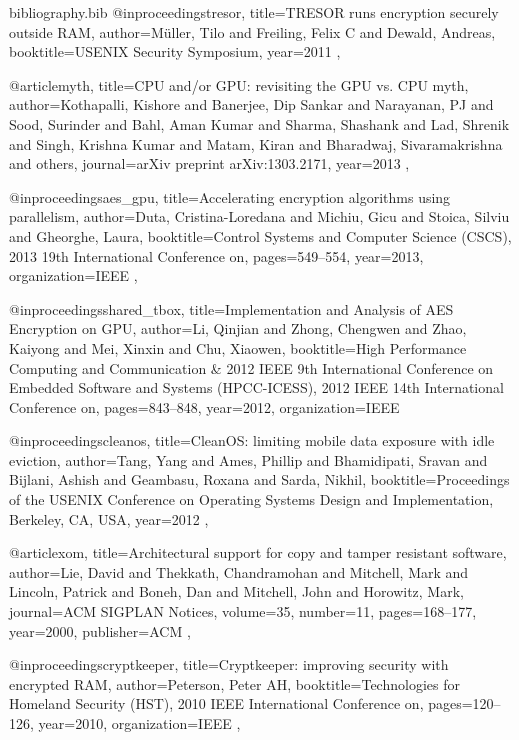 \documentclass[conference,10pt]{IEEEtran}
\begin{document}
\begin{filecontents*}{bibliography.bib}
    @inproceedings{tresor,
        title={{TRESOR runs encryption securely outside RAM}},
        author={M{\"u}ller, Tilo and Freiling, Felix C and Dewald, Andreas},
        booktitle={USENIX Security Symposium},
        year={2011}
    },

    @article{myth,
        title={{CPU and/or GPU: revisiting the GPU vs. CPU myth}},
        author={Kothapalli, Kishore and Banerjee, Dip Sankar and Narayanan, PJ and Sood, Surinder and Bahl, 
        Aman Kumar and Sharma, Shashank and Lad, Shrenik and Singh, Krishna Kumar and Matam, Kiran and 
    Bharadwaj, Sivaramakrishna and others},
        journal={arXiv preprint arXiv:1303.2171},
        year={2013}
    },

    @inproceedings{aes_gpu,
        title={Accelerating encryption algorithms using parallelism},
        author={Duta, Cristina-Loredana and Michiu, Gicu and Stoica, Silviu and Gheorghe, Laura},
        booktitle={Control Systems and Computer Science (CSCS), 2013 19th International Conference on},
        pages={549--554},
        year={2013},
        organization={IEEE}
    },

    @inproceedings{shared_tbox,
        title={Implementation and Analysis of AES Encryption on GPU},
        author={Li, Qinjian and Zhong, Chengwen and Zhao, Kaiyong and Mei, Xinxin and Chu, Xiaowen},
        booktitle={High Performance Computing and Communication \& 2012 IEEE 9th International Conference 
    on Embedded Software and Systems (HPCC-ICESS), 2012 IEEE 14th International Conference on},
        pages={843--848},
        year={2012},
        organization={IEEE}
    }

    @inproceedings{cleanos,
        title={{CleanOS: limiting mobile data exposure with idle eviction}},
        author={Tang, Yang and Ames, Phillip and Bhamidipati, Sravan and Bijlani, Ashish and Geambasu, 
        Roxana and Sarda, Nikhil},
        booktitle={Proceedings of the USENIX Conference on Operating Systems Design and Implementation, 
        Berkeley, CA, USA},
        year={2012}
    },

    @article{xom,
        title={Architectural support for copy and tamper resistant software},
        author={Lie, David and Thekkath, Chandramohan and Mitchell, Mark and Lincoln, Patrick and Boneh, 
        Dan and Mitchell, John and Horowitz, Mark},
        journal={ACM SIGPLAN Notices},
        volume={35},
        number={11},
        pages={168--177},
        year={2000},
        publisher={ACM}
    },

    @inproceedings{cryptkeeper,
        title={Cryptkeeper: improving security with encrypted RAM},
        author={Peterson, Peter AH},
        booktitle={Technologies for Homeland Security (HST), 2010 IEEE International Conference on},
        pages={120--126},
        year={2010},
        organization={IEEE}
    },


\end{filecontents*}
\end{document}
